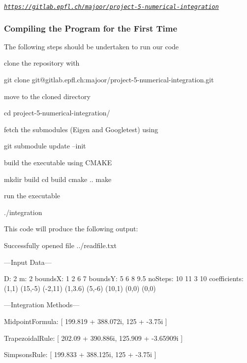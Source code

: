 {\itshape \href{https://gitlab.epfl.ch/majoor/project-5-numerical-integration}{\tt https\+://gitlab.\+epfl.\+ch/majoor/project-\/5-\/numerical-\/integration}}

\subsubsection*{Compiling the Program for the First Time}

The following steps should be undertaken to run our code
\begin{DoxyItemize}
\item clone the repository with 
\begin{DoxyCode}
git clone git@gitlab.epfl.ch:majoor/project-5-numerical-integration.git
\end{DoxyCode}

\item move to the cloned directory 
\begin{DoxyCode}
cd project-5-numerical-integration/
\end{DoxyCode}

\item fetch the submodules (Eigen and Googletest) using 
\begin{DoxyCode}
git submodule update --init
\end{DoxyCode}

\item build the executable using C\+M\+A\+KE 
\begin{DoxyCode}
mkdir build
cd build
cmake ..
make
\end{DoxyCode}

\item run the executable 
\begin{DoxyCode}
./integration
\end{DoxyCode}

\end{DoxyItemize}

This code will produce the following output\+: 
\begin{DoxyCode}
Successfully opened file ../readfile.txt

---Input Data---

D: 2
m: 2
boundsX: 
1 2
6 7
boundsY: 
  5   6
  8 9.5
noSteps: 
10 11
 3 10
coefficients: 
  (1,1) (15,-5) (-2,11) (1,3.6)
 (5,-6)  (10,1)   (0,0)   (0,0)

---Integration Methods---

MidpointFormula:
[ 199.819 + 388.072i,
125 + -3.75i ]

TrapezoidalRule:
[ 202.09 + 390.886i,
125.909 + -3.65909i ]

SimpsonsRule:
[ 199.833 + 388.125i,
125 + -3.75i ]
\end{DoxyCode}


